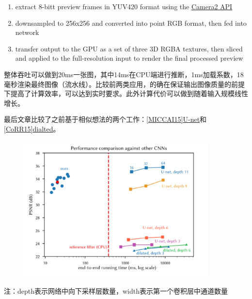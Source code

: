 \begin{enumerate}
\def\labelenumi{\arabic{enumi}.}
\item
  extract 8-bitt preview frames in YUV420 format using the
  \href{https://developer.android.com/reference/android/hardware/camera2/package-summary}{Camera2
  API}
\item
  downsampled to 256x256 and converted into point RGB format, then fed
  into network
\item
  transfer output to the GPU as a set of three 3D RGBA textures, then
  sliced and applied to the full-resolution input to render the final
  processed preview
\end{enumerate}

整体吞吐可以做到20ms一张图，其中14ms在CPU端进行推断，1ms加载系数，18毫秒渲染最终图像（流水线）。比较前两类应用，的确在保证输出图像质量的前提下提高了计算效率，可以达到实时要求。此外计算代价可以做到随着输入规模线性增长。

最后文章比较了之前基于相似想法的两个工作：\href{https://arxiv.org/abs/1505.04597}{{[}MICCAI15{]}U-net}和\href{https://arxiv.org/abs/1511.07122}{{[}CoRR15{]}dialted}。

\begin{figure}
\centering
\includegraphics[width=0.9\textwidth]{./images/DeepBilateralLearning04.png}
\caption{}
\end{figure}

注：depth表示网络中向下采样层数量，width表示第一个卷积层中通道数量